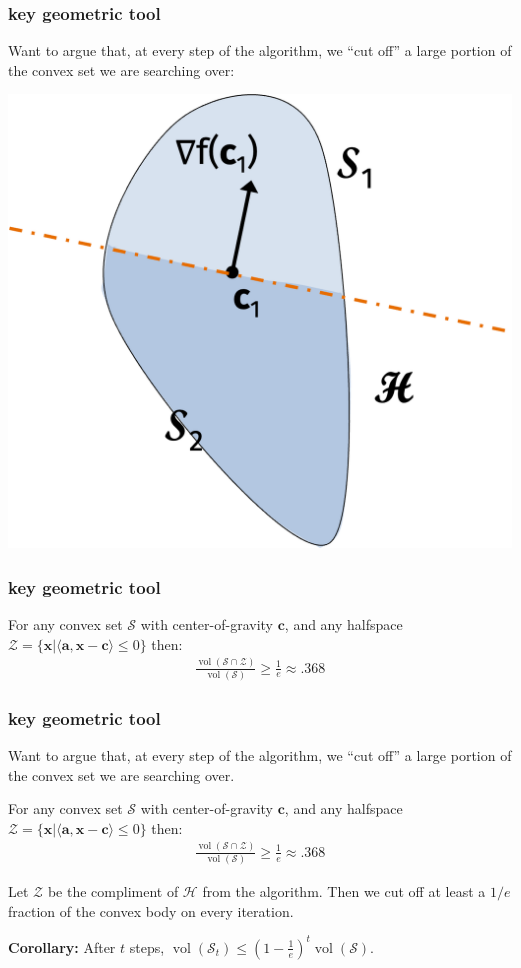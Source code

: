 \documentclass[compress]{beamer}
\newcommand{\bv}[1]{\mathbf{#1}}
\DeclareMathOperator{\vol}{vol}
\begin{document}
\begin{frame}[t]
	\frametitle{key geometric tool}
	Want to argue that, at every step of the algorithm, we ``cut off'' a large portion of the convex set we are searching over:
	
	\begin{center}
		\includegraphics[width=.5\textwidth]{cog3.png}
	\end{center}
\end{frame}

\begin{frame}[t]
	\frametitle{key geometric tool}
	\begin{theorem}
		For any convex set $\mathcal{S}$ with center-of-gravity $\bv{c}$, and any halfspace 	$\mathcal{Z} = \{\bv{x} \big\vert \langle \bv{a}, \bv{x}-\bv{c}\rangle \leq 0\}$ then:
		\begin{align*}
			\frac{\vol(\mathcal{S} \cap \mathcal{Z})}{\vol(\mathcal{S})}\geq \frac{1}{e} \approx .368
		\end{align*}
	\end{theorem}

\end{frame}

\begin{frame}[t]
	\frametitle{key geometric tool}
	Want to argue that, at every step of the algorithm, we ``cut off'' a large portion of the convex set we are searching over.
	
	\begin{theorem}
		For any convex set $\mathcal{S}$ with center-of-gravity $\bv{c}$, and any halfspace 	$\mathcal{Z} = \{\bv{x} \big\vert \langle \bv{a}, \bv{x}-\bv{c}\rangle \leq 0\}$ then:
		\begin{align*}
			\frac{\vol(\mathcal{S} \cap \mathcal{Z})}{\vol(\mathcal{S})}\geq \frac{1}{e} \approx .368
		\end{align*}
	\end{theorem}
	
	Let $\mathcal{Z}$ be the compliment of $\mathcal{H}$ from the algorithm. Then we cut off at least a $1/e$ fraction of the convex body on every iteration.  
	
	\textbf{Corollary:} After $t$ steps, $\vol(\mathcal{S}_t) \leq \left(1-\frac{1}{e}\right)^t\vol(\mathcal{S})$.
\end{frame}
\end{document}

